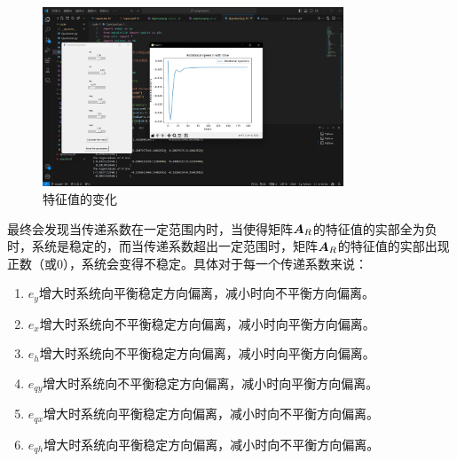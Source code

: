 \documentclass[UTF8]{ctexart}
\begin{document}
\begin{figure}[htbp]
    \centering
    \includegraphics[width=0.8\textwidth]{pic/eigensys.png}
    \caption{特征值的变化}
\end{figure}

最终会发现当传递系数在一定范围内时，当使得矩阵$\boldsymbol{A}_R$的特征值的实部全为负时，系统是稳定的，而当传递系数超出一定范围时，矩阵$\boldsymbol{A}_R$的特征值的实部出现正数（或0），系统会变得不稳定。具体对于每一个传递系数来说：

\begin{enumerate}
  \item $e_y$增大时系统向平衡稳定方向偏离，减小时向不平衡方向偏离。
  \item $e_x$增大时系统向不平衡稳定方向偏离，减小时向平衡方向偏离。
  \item $e_h$增大时系统向不平衡稳定方向偏离，减小时向平衡方向偏离。
  \item $e_{qy}$增大时系统向不平衡稳定方向偏离，减小时向平衡方向偏离。
  \item $e_{qx}$增大时系统向平衡稳定方向偏离，减小时向不平衡方向偏离。
  \item $e_{qh}$增大时系统向平衡稳定方向偏离，减小时向不平衡方向偏离。
\end{enumerate}
\end{document}
